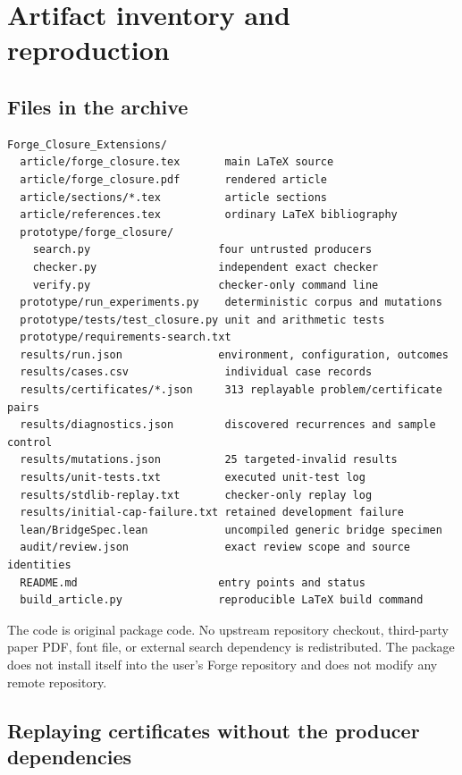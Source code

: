 \section{Artifact inventory and reproduction}
\label{sec:artifacts}

\subsection{Files in the archive}

\begin{lstlisting}
Forge_Closure_Extensions/
  article/forge_closure.tex       main LaTeX source
  article/forge_closure.pdf       rendered article
  article/sections/*.tex          article sections
  article/references.tex          ordinary LaTeX bibliography
  prototype/forge_closure/
    search.py                    four untrusted producers
    checker.py                   independent exact checker
    verify.py                    checker-only command line
  prototype/run_experiments.py    deterministic corpus and mutations
  prototype/tests/test_closure.py unit and arithmetic tests
  prototype/requirements-search.txt
  results/run.json               environment, configuration, outcomes
  results/cases.csv               individual case records
  results/certificates/*.json     313 replayable problem/certificate pairs
  results/diagnostics.json        discovered recurrences and sample control
  results/mutations.json          25 targeted-invalid results
  results/unit-tests.txt          executed unit-test log
  results/stdlib-replay.txt       checker-only replay log
  results/initial-cap-failure.txt retained development failure
  lean/BridgeSpec.lean            uncompiled generic bridge specimen
  audit/review.json               exact review scope and source identities
  README.md                      entry points and status
  build_article.py               reproducible LaTeX build command
\end{lstlisting}

The code is original package code. No upstream repository checkout, third-party paper PDF, font file, or external search dependency is redistributed. The package does not install itself into the user's Forge repository and does not modify any remote repository.

\subsection{Replaying certificates without the producer dependencies}

